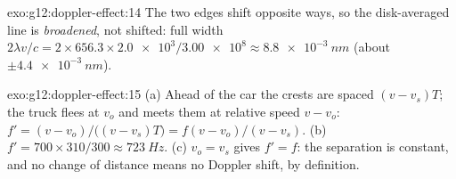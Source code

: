 \begin{solution}{exo:g12:doppler-effect:14}
The two edges shift opposite ways, so the disk-averaged line is \emph{broadened}, not
shifted: full width $2\lambda v/c = 2 \times 656.3 \times \num{2.0e3}/\num{3.00e8}
\approx \qty{8.8e-3}{nm}$ (about $\pm\qty{4.4e-3}{nm}$).
\end{solution}

\begin{solution}{exo:g12:doppler-effect:15}
(a) Ahead of the car the crests are spaced $(v - v_s)T$; the truck flees at $v_o$ and
meets them at relative speed $v - v_o$: $f' = (v - v_o)/\bigl((v - v_s)T\bigr) =
f(v - v_o)/(v - v_s)$. (b) $f' = 700 \times 310/300 \approx \qty{723}{Hz}$.
(c) $v_o = v_s$ gives $f' = f$: the separation is constant, and no change of distance
means no Doppler shift, by definition.
\end{solution}

